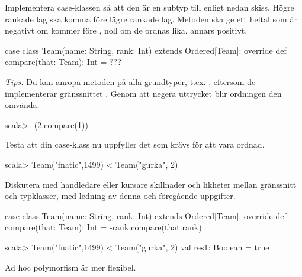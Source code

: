\Subtask Implementera case-klassen  så att den är en subtyp till  enligt nedan skiss. Högre rankade lag ska komma före lägre rankade lag. Metoden  ska ge ett heltal som är negativt om  kommer före , noll om de ordnas lika, annars positivt.

\begin{Code}
case class Team(name: String, rank: Int) extends Ordered[Team]:
  override def compare(that: Team): Int = ???
\end{Code}
\emph{Tips:} Du kan anropa metoden  på alla grundtyper, t.ex. , eftersom de implementerar gränssnittet . Genom att negera uttrycket blir ordningen den omvända. 

\begin{REPLnonum}
scala> -(2.compare(1))
\end{REPLnonum}

\Subtask Testa att  din case-klass nu uppfyller det som krävs för att vara ordnad.
\begin{REPLnonum}
scala> Team("fnatic",1499) < Team("gurka", 2)
\end{REPLnonum}


\Subtask Diskutera med handledare eller kursare skillnader och likheter mellan gränssnitt och typklasser, med ledning av denna och föregående uppgifter.
\SOLUTION


\TaskSolved \what

\SubtaskSolved

\begin{Code}
case class  Team(name: String, rank: Int) extends Ordered[Team]:
  override def compare(that: Team): Int = -rank.compare(that.rank)
\end{Code}

\SubtaskSolved

\begin{REPLnonum}
scala> Team("fnatic",1499) < Team("gurka", 2)
val res1: Boolean = true
\end{REPLnonum}

\SubtaskSolved Ad hoc polymorfism är mer flexibel. 

\QUESTEND






